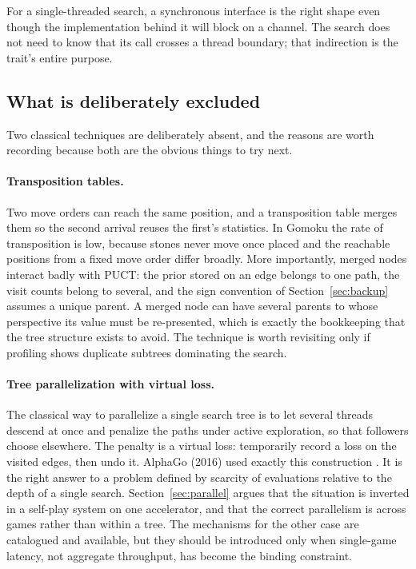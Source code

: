 For a single-threaded search, a synchronous interface is the right shape even
though the implementation behind it will block on a channel. The search does not
need to know that its call crosses a thread boundary; that indirection is the
trait's entire purpose.

\subsection{What is deliberately excluded}
\label{sec:excluded}

Two classical techniques are deliberately absent, and the reasons are worth
recording because both are the obvious things to try next.

\paragraph{Transposition tables.} Two move orders can reach the same position, and
a transposition table merges them so the second arrival reuses the first's
statistics. In Gomoku the rate of transposition is low, because stones never move
once placed and the reachable positions from a fixed move order differ broadly.
More importantly, merged nodes interact badly with PUCT: the prior stored on an
edge belongs to one path, the visit counts belong to several, and the
sign convention of Section~\ref{sec:backup} assumes a unique parent. A merged
node can have several parents to whose perspective its value must be
re-presented, which is exactly the bookkeeping that the tree structure exists to
avoid. The technique is worth revisiting only if profiling shows duplicate
subtrees dominating the search.

\paragraph{Tree parallelization with virtual loss.} The classical way to
parallelize a single search tree is to let several threads descend at once and
penalize the paths under active exploration, so that followers choose elsewhere.
The penalty is a virtual loss: temporarily record a loss on the visited edges,
then undo it. AlphaGo (2016) used exactly this construction
\citep{chaslot2008parallel,segal2011paralleluct,silver2016alphago}. It is the
right answer to a problem defined by scarcity of evaluations relative to the
depth of a single search. Section~\ref{sec:parallel} argues that the situation is
inverted in a self-play system on one accelerator, and that the correct
parallelism is across games rather than within a tree. The mechanisms for the
other case are catalogued and available, but they should be introduced only when
single-game latency, not aggregate throughput, has become the binding
constraint.
